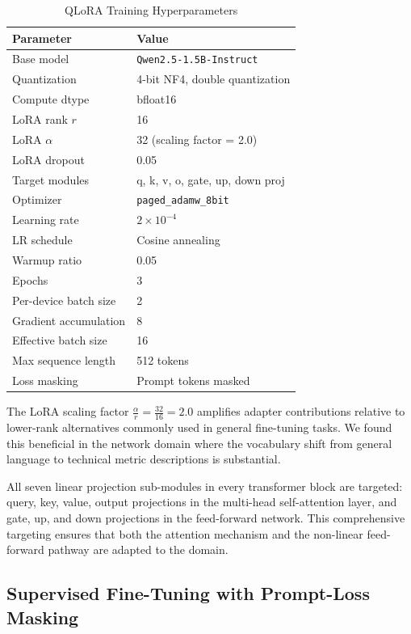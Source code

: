 \documentclass[conference]{IEEEtran}
\begin{document}
\begin{table}[htbp]
\centering
\caption{QLoRA Training Hyperparameters}
\label{tab:hyperparams}
\begin{tabular}{ll}
\toprule
\textbf{Parameter} & \textbf{Value} \\
\midrule
Base model & \texttt{Qwen2.5-1.5B-Instruct} \\
Quantization & 4-bit NF4, double quantization \\
Compute dtype & bfloat16 \\
LoRA rank $r$ & 16 \\
LoRA $\alpha$ & 32 (scaling factor = 2.0) \\
LoRA dropout & 0.05 \\
Target modules & q, k, v, o, gate, up, down proj \\
Optimizer & \texttt{paged\_adamw\_8bit} \\
Learning rate & $2 \times 10^{-4}$ \\
LR schedule & Cosine annealing \\
Warmup ratio & 0.05 \\
Epochs & 3 \\
Per-device batch size & 2 \\
Gradient accumulation & 8 \\
Effective batch size & 16 \\
Max sequence length & 512 tokens \\
Loss masking & Prompt tokens masked \\
\bottomrule
\end{tabular}
\end{table}

The LoRA scaling factor $\frac{\alpha}{r} = \frac{32}{16} = 2.0$ amplifies adapter contributions relative to lower-rank alternatives commonly used in general fine-tuning tasks. We found this beneficial in the network domain where the vocabulary shift from general language to technical metric descriptions is substantial.

All seven linear projection sub-modules in every transformer block are targeted: query, key, value, output projections in the multi-head self-attention layer, and gate, up, and down projections in the feed-forward network. This comprehensive targeting ensures that both the attention mechanism and the non-linear feed-forward pathway are adapted to the domain.

\subsection{Supervised Fine-Tuning with Prompt-Loss Masking}
\end{document}
